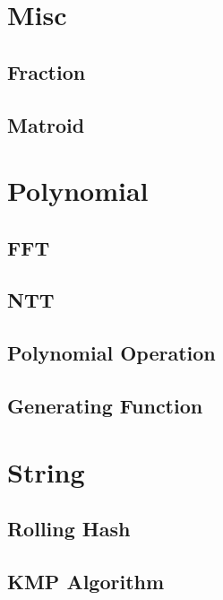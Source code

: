 \documentclass{article}
\begin{document}
\section{Misc}

\subsection{Fraction}


\subsection{Matroid}


\section{Polynomial}

\subsection{FFT}


\subsection{NTT}


\subsection{Polynomial Operation}


\subsection{Generating Function}


\section{String}

\subsection{Rolling Hash}


\subsection{KMP Algorithm}

\end{document}
